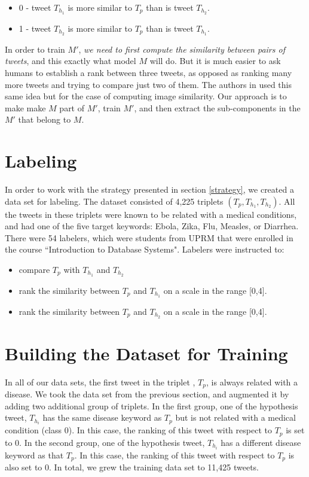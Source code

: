 \documentclass[12pt]{report}
\begin{document}
\begin{itemize}
	\item 0 - tweet $T_{h_1}$ is more similar to $T_p$ than is tweet $T_{h_2}$.
	\item 1 - tweet $T_{h_2}$ is more similar to $T_p$ than is tweet $T_{h_1}$.
\end{itemize}
In order to train $M'$, {\em we need to first compute the similarity between pairs of tweets}, and this exactly what model $M$ will do. But it is much easier to ask humans to establish a rank between three tweets, as opposed as ranking many more tweets and trying to compare just two of them. The authors in \cite{Wang2014} used this same idea but for 
the case of computing image similarity. Our approach is to make make $M$ part of $M'$, 
train $M'$, and then extract the sub-components in the $M'$ that belong to $M$. 

\section{Labeling}
In order to work with the strategy presented in section \ref{strategy}, we created a data set for labeling. 
The dataset consisted of  4,225 triplets $(T_p, T_{h_1}, T_{h_2})$. All the tweets in these triplets were known to 
be related with a medical conditions, and had one of the five target keywords: Ebola, Zika, Flu, Measles, or Diarrhea.
There were 54 labelers, which were students from UPRM
that were enrolled in the course ``Introduction to Database Systems". Labelers were instructed to:
\begin{itemize}[nolistsep]
	\item compare $T_p$ with   $T_{h_1}$ and  $T_{h_2}$
	\item rank the similarity between $T_p$  and   $T_{h_1}$ on a scale in the range [0,4].
	\item rank the similarity between $T_p$  and   $T_{h_2}$ on a scale in the range [0,4].
\end{itemize}

\section{Building the Dataset for Training \label{buildtrain}}
In all of our data sets, the first tweet in the triplet , $T_p$, is always related with a disease. 
We took the data set from the previous section, and augmented it by adding two additional group of triplets.  In the first group, one of the 
hypothesis tweet, $T_{h_i}$ has the same disease keyword as $T_p$ but is not related with a medical condition (class 0). In this case, the 
ranking of this tweet with respect to $T_p$ is set to 0. In the second group, one of the 
hypothesis tweet, $T_{h_i}$ has a different disease keyword as that $T_p$.  In this case, the 
ranking of this tweet with respect to $T_p$ is also set to 0. In total, we grew the training data set to 11,425 tweets. 
\end{document}
